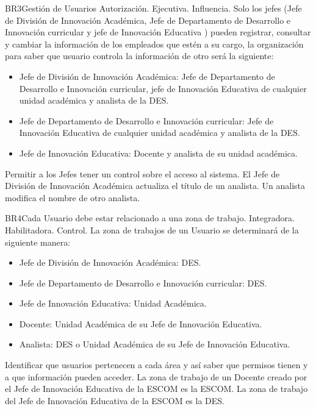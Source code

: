 \begin{BussinesRule}{BR3}{Gestión de Usuarios}
    \BRitem[Tipo:] Autorización.
    \BRitem[Clase:] Ejecutiva.
    \BRitem[Nivel:] Influencia.
    \BRitem[Descripción:] Solo los jefes (Jefe de División de Innovación Académica, Jefe de Departamento de Desarrollo e Innovación curricular y jefe de Innovación Educativa ) pueden registrar, consultar y cambiar  la información de los empleados que estén a su cargo, la organización para saber que usuario controla  la información de otro  será la siguiente:
    \begin{itemize}
        \item Jefe de División de Innovación Académica: Jefe de Departamento de Desarrollo e Innovación curricular, jefe de Innovación Educativa de cualquier unidad académica  y analista de la DES.
        \item Jefe de Departamento de Desarrollo e Innovación curricular: Jefe de Innovación Educativa de cualquier unidad académica  y analista de la DES.
        \item Jefe de Innovación Educativa: Docente y analista de su unidad académica.
    \end{itemize}
    \BRitem[Motivación:] Permitir a los Jefes tener un control sobre el acceso al sistema.
     El Jefe de División de Innovación Académica  actualiza el título de un analista.
     Un analista modifica  el nombre de otro analista.
\end{BussinesRule}
\begin{BussinesRule}{BR4}{Cada Usuario debe estar relacionado a una zona de trabajo.}
    \BRitem[Tipo:] Integradora.
    \BRitem[Clase:] Habilitadora.
    \BRitem[Nivel:] Control.
    \BRitem[Descripción:] La zona de trabajos de un Usuario se determinará de la siguiente manera:
    \begin{itemize}
        \item Jefe de División de Innovación Académica: DES.
        \item Jefe de Departamento de Desarrollo e Innovación curricular: DES.
        \item Jefe de Innovación Educativa: Unidad Académica.
        \item Docente: Unidad Académica de su Jefe de Innovación Educativa.
        \item Analista:  DES o Unidad Académica de su Jefe de Innovación Educativa.
    \end{itemize}
    \BRitem[Motivación:] Identificar que usuarios pertenecen a cada área y así saber que permisos tienen y a que información pueden acceder.
     La zona de trabajo de un Docente creado por el Jefe de Innovación Educativa de la ESCOM es la ESCOM.
     La zona de trabajo del Jefe de Innovación Educativa de la ESCOM es la DES.
\end{BussinesRule}
